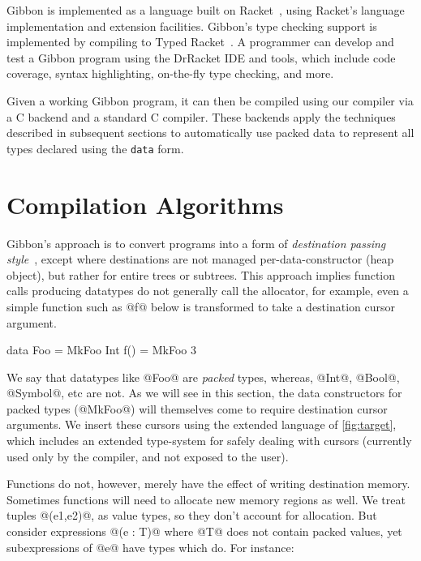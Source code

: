 \documentclass[a4paper,english]{lipics-v2016}
\newcommand{\treelang}{Gibbon\xspace} %
\newif\ifcurly
\newcommand{\finishmecurly}{\ifcurly \Red{FINISHME - do ifcurly version here} \else}
\begin{document}
\treelang is implemented as a language built on Racket~\cite{plt-tr1},
using Racket's language implementation and extension
facilities. \treelang's type checking support is implemented by
compiling to Typed Racket~\cite{popl08}. A programmer can
develop and test a \treelang program using the DrRacket IDE and tools,
which include code coverage, syntax highlighting, on-the-fly type
checking, and more.

Given a working \treelang program, it can then be compiled using our
compiler via a C backend and a standard C compiler. These backends
apply the techniques described in subsequent sections to automatically
use  packed data to represent all types declared using the
\texttt{data} form.  



\section{Compilation Algorithms} \label{sec:compiler}

\treelang{}'s approach is to convert programs into a form of {\em destination
  passing style}~\cite{larus89}, except where destinations are not managed
per-data-constructor (heap object), but rather for entire trees or subtrees.  This approach
implies function calls producing datatypes do not generally call the allocator,
for example, even a simple function such as @f@ below is transformed to take a
destination cursor argument.

\finishmecurly
\begin{code}
  data Foo = MkFoo Int
  f() = MkFoo 3
\end{code}
\fi

We say that datatypes like @Foo@ are {\em packed} types, whereas, @Int@, @Bool@,
@Symbol@, etc are not.  As we will see in this section, the data constructors for
packed types (@MkFoo@) will themselves come to require destination cursor arguments.
%
We insert these cursors using the extended language of \cref{fig:target}, which
includes an extended type-system for safely dealing with cursors (currently used
only by the compiler, and not exposed to the user).

Functions do not, however, merely have the effect of writing destination memory.
Sometimes functions will need to allocate new memory regions as well.  We treat
tuples @(e1,e2)@, as value types, so they don't account for allocation.  But
consider expressions @(e : T)@ where @T@ does not contain packed values, yet
subexpressions of @e@ have types which do.  For instance:
\end{document}
